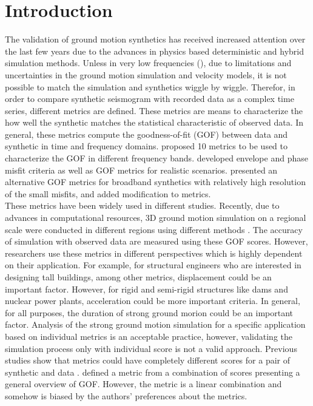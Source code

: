 
\section{Introduction}

The validation of ground motion synthetics has received increased attention over the last few years due to the advances in physics based deterministic and hybrid simulation methods. Unless in very low frequencies (), due to limitations and uncertainties in the ground motion simulation and velocity models, it is not possible to match the simulation and synthetics wiggle by wiggle. Therefor, in order to compare synthetic seismogram with recorded data as a complex time series, different metrics are defined. These metrics are means to characterize the how well the synthetic matches the statistical characteristic of observed data. In general, these metrics compute the goodness-of-fit (GOF) between data and synthetic in time and frequency domains. \citet{Anderson_2004_Proc} proposed 10 metrics to be used to characterize the GOF in different frequency bands. \citet{Kristekova_2006_BSSA,Kristekova_2009_GJI} developed envelope and phase misfit criteria as well as GOF metrics for realistic scenarios. \citet{Olsen_2010_SRL} presented an alternative GOF metrics for broadband synthetics with relatively high resolution of the small misfits, and \citet{Taborda_2013_BSSA} added modification to \citet{Anderson_2004_Proc} metrics.\\
These metrics have been widely used in different studies. Recently, due to advances in computational resources, 3D ground motion simulation on a regional scale were conducted in different regions using different methods \citep[e.g.,][]{Taborda_2016_GJI,Komatitsch_2004_BSSA,Bielak_2010_GJI,Roten_2016_GJI}. The accuracy of simulation with observed data are measured using these GOF scores. However, researchers use these metrics in different perspectives which is highly dependent on their application. For example, for structural engineers who are interested in designing tall buildings, among other metrics, displacement could be an important factor. However, for rigid and semi-rigid structures like dams and nuclear power plants, acceleration could be more important criteria. In general, for all purposes, the duration of strong ground morion could be an important factor. Analysis of the strong ground motion simulation for a specific application based on individual metrics is an acceptable practice, however, validating the simulation process only with individual score is not a valid approach. Previous studies show that metrics could have completely different scores for a pair of synthetic and data \citep[e.g.,][]{Taborda_2016_GJI}. \citet{Taborda_2013_BSSA} defined a metric from a combination of  \citet{Anderson_2004_Proc} scores presenting a general overview of GOF. However, the metric is a linear combination and somehow is biased by the authors' preferences about the metrics. \\
